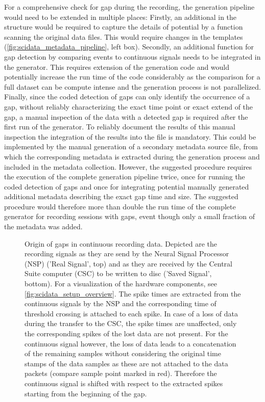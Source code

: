For a comprehensive check for gap during the recording, the  generation pipeline would need to be extended in multiple places: Firstly, an additional  in the  structure would be required to capture the details of potential by a function scanning the original data files. This would require changes in the  templates (\cref{fig:scidata_metadata_pipeline}, left box). Secondly, an additional function for gap detection by comparing events to continuous signals needs to be integrated in the  generator. This requires extension of the  generation code and would potentially increase the run time of the code considerably as the comparison for a full dataset can be compute intense and the  generation process is not parallelized. Finally, since the coded detection of gaps can only identify the occurrence of a gap, without reliably characterizing the exact time point or exact extend of the gap, a manual inspection of the data with a detected gap is required after the first run of the  generator. To reliably document the results of this manual inspection the integration of the results into the  file is mandatory. This could be implemented by the manual generation of a secondary metadata source file, from which the corresponding metadata is extracted during the  generation process and included in the metadata collection. However, the suggested procedure requires the execution of the complete  generation pipeline twice, once for running the coded detection of gaps and once for integrating potential manually generated additional metadata describing the exact gap time and size. The suggested procedure would therefore more than double the run time of the complete  generator for recording sessions with gaps, event though only a small fraction of the metadata was added.

\begin{figure}
 \centering
 
 \caption[Origin of gaps in continuous recording data]{Origin of gaps in continuous recording data. Depicted are the recording signals as they are send by the Neural Signal Processor (NSP) ('Real Signal', top) and as they are received by the Central Suite computer (CSC) to be written to disc ('Saved Signal', bottom). For a visualization of the hardware components, see \cref{fig:scidata_setup_overview}. The spike times are extracted from the continuous signals by the NSP and the corresponding time of threshold crossing is attached to each spike. In case of a loss of data during the transfer to the CSC, the spike times are unaffected, only the corresponding spikes of the lost data are not present. For the continuous signal however, the loss of data leads to a concatenation of the remaining samples without considering the original time stamps of the data samples as these are not attached to the data packets (compare sample point marked in red). Therefore the continuous signal is shifted with respect to the extracted spikes starting from the beginning of the gap.}
 \label{fig:scidata_gaps}
\end{figure}


